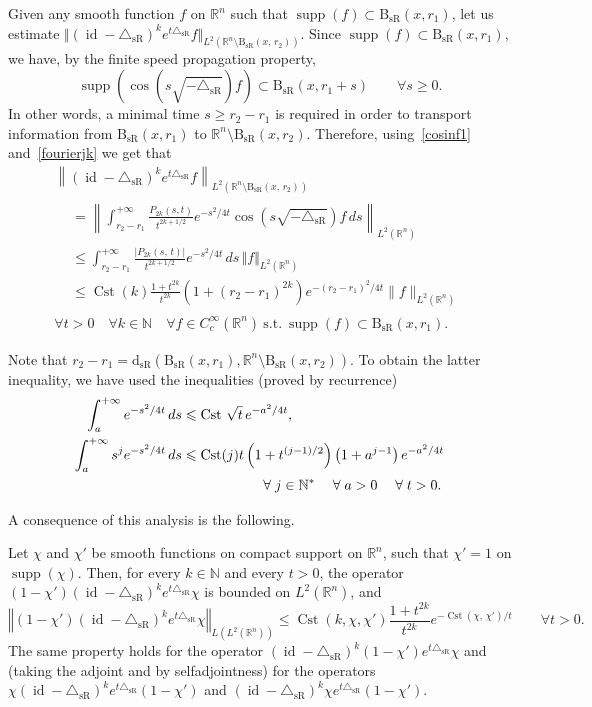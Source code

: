 \documentclass[10pt]{amsart}
\theoremstyle{definition}\newtheorem{defi}[theo]{Definition}\newtheorem{rema}[theo]{Remark}\newtheorem{exam}[theo]{Example}\newtheorem{exem}[theo]{Example}\newtheorem{nota}[theo]{Notation}
\newcommand*\R{\mathbb{R}}
\newcommand*\N{\mathbb{N}}
\DeclareMathOperator{\supp}{supp}
\DeclareMathOperator{\Cst}{Cst}
\DeclareMathOperator{\id}{id}
\newcommand{\trianglesR}{\triangle_{\mathrm{sR}}}
\newcommand{\dsR}{\mathrm{d}_{\mathrm{sR}}}
\newcommand{\BsR}{\mathrm{B}_{\mathrm{sR}}}
\renewcommand{\geq}{\geqslant}
\renewcommand{\leq}{\leqslant}
\let\oldforall\forall
\renewcommand*{\forall}{\mathrel{\oldforall}}
\begin{document}
Given any smooth function $f$ on $\R^n$ such that $\supp(f)\subset\BsR(x,r_1)$, let us estimate $\Vert (\id-\trianglesR)^{k}e^{t\trianglesR} f\Vert_{L^2(\R^n\setminus \BsR(x,\,r_2))}$. Since $\supp(f)\subset \BsR(x,r_1)$, we have, by the finite speed propagation property,
\[
\supp\left(\cos\left(s\sqrt{-\trianglesR}\right) f\right) \subset \BsR(x,r_1+s)\qquad\forall s\geq 0.
\]
In other words, a minimal time $s\geq r_2-r_1$ is required in order to transport information from $\BsR(x,r_1)$ to $\R^n\setminus \BsR(x,r_2)$. Therefore, using~\eqref{cosinf1} and~\eqref{fourierjk} we get that
\begin{multline}\label{estimate_glob}
\left\|\left(\id-\trianglesR\right)^{k}  e^{t\trianglesR} f \right\|_{L^2\left(\R^n\setminus \BsR(x,\,r_2)\right)} \\
\begin{aligned}
& = \left\| \int_{r_2-r_1}^{+\infty} \frac{P_{2k}(s,t)}{t^{2k+1/2}} e^{-s^2/4t} \cos\left(s\sqrt{-\trianglesR}\right)f\, ds \right\|_{L^2\left(\R^n\right)} \\
&\leq \int_{r_2-r_1}^{+\infty} \frac{\vert P_{2k}(s,\,t)\vert}{t^{2k+1/2}} e^{-s^2/4t}\, ds\, \Vert f\Vert_{L^2\left(\R^n\right)} \\
&\leq \Cst(k)\frac{1+t^{2k}}{t^{2k}} \left(1+(r_2-r_1)^{2k}\right) e^{-(r_2-r_1)^2/4t} \| f\|_{L^2\left(\R^n\right)} 
\end{aligned}
\\[2mm]
\forall t>0 \quad \forall k\in\N\quad \forall f\in C_c^\infty\left(\R^n\right) \ \text{s.t.}\ \supp(f)\subset \BsR(x,r_1).
\end{multline}
\vspace{2em}

Note that $r_2-r_1 = \dsR(\BsR(x,r_1),\R^n\setminus \BsR(x,r_2))$. To obtain the latter inequality, we have used the inequalities (proved by recurrence)
\begin{align*}
\int_a^{+\infty} e^{-s^2/4t}\, ds &\leq \Cst \, \sqrt{t}\, e^{-a^2/4t}, \\
\int_a^{+\infty} s^j e^{-s^2/4t}\, ds &\leq \Cst(j) t \left(1+t^{(j-1)/2}\right)\left(1+a^{j-1}\right) e^{-a^2/4t}\\
& \mkern100mu \forall j\in\N^*\quad \forall a>0\quad \forall t>0.
\end{align*}

A consequence of this analysis is the following.

\begin{prop}
Let $\chi$ and $\chi'$ be smooth functions on compact support on $\R^n$, such that $\chi'=1$ on $\supp(\chi)$. Then, for every $k\in\N$ and every $t>0$, the operator $(1-\chi') (\id-\trianglesR)^{k}e^{t\trianglesR} \chi$ is bounded on $L^2(\R^n)$, and
\[
\left\Vert (1-\chi') (\id-\trianglesR)^{k}e^{t\trianglesR} \chi \right\Vert_{L\left(L^2\left(\R^n\right)\right)}
\leq \Cst(k,\chi,\chi')\frac{1+t^{2k}}{t^{2k}} e^{-\Cst(\chi,\,\chi')/t} \qquad\forall t>0.
\]
The same property holds for the operator $(\id-\trianglesR)^{k}(1-\chi')e^{t\trianglesR} \chi$ and (taking the adjoint and by selfadjointness) for the operators $\chi (\id-\trianglesR)^{k}e^{t\trianglesR} (1-\chi')$ and $(\id-\trianglesR)^{k} \chi e^{t\trianglesR} (1-\chi')$.
\end{prop}
\end{document}
